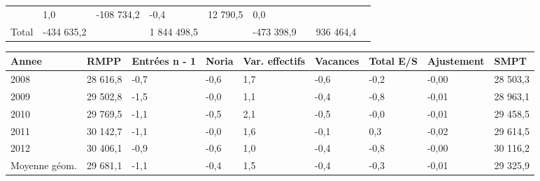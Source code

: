 \begin{longtable}[]{@{}lllllllll@{}}
\begin{minipage}[t]{0.17\columnwidth}
\end{minipage} & \begin{minipage}[t]{0.06\columnwidth}\raggedright
1,0\strut
\end{minipage} & \begin{minipage}[t]{0.12\columnwidth}\raggedright
-108 734,2\strut
\end{minipage} & \begin{minipage}[t]{0.06\columnwidth}\raggedright
-0,4\strut
\end{minipage} & \begin{minipage}[t]{0.08\columnwidth}\raggedright
12 790,5\strut
\end{minipage} & \begin{minipage}[t]{0.06\columnwidth}\raggedright
0,0\strut
\end{minipage}\tabularnewline
\begin{minipage}[t]{0.05\columnwidth}\raggedright
Total\strut
\end{minipage} & \begin{minipage}[t]{0.10\columnwidth}\raggedright
-434 635,2\strut
\end{minipage} & \begin{minipage}[t]{0.06\columnwidth}\raggedright
\strut
\end{minipage} & \begin{minipage}[t]{0.17\columnwidth}\raggedright
1 844 498,5\strut
\end{minipage} & \begin{minipage}[t]{0.06\columnwidth}\raggedright
\strut
\end{minipage} & \begin{minipage}[t]{0.12\columnwidth}\raggedright
-473 398,9\strut
\end{minipage} & \begin{minipage}[t]{0.06\columnwidth}\raggedright
\strut
\end{minipage} & \begin{minipage}[t]{0.08\columnwidth}\raggedright
936 464,4\strut
\end{minipage} & \begin{minipage}[t]{0.06\columnwidth}\raggedright
\strut
\end{minipage}\tabularnewline
\bottomrule
\end{longtable}

\begin{longtable}[]{@{}lllllllll@{}}
\toprule
Annee & RMPP & Entrées n - 1 & Noria & Var. effectifs & Vacances & Total
E/S & Ajustement & SMPT\tabularnewline
\midrule
\endhead
2008 & 28 616,8 & -0,7 & -0,6 & 1,7 & -0,6 & -0,2 & -0,00 & 28
503,3\tabularnewline
2009 & 29 502,8 & -1,5 & -0,0 & 1,1 & -0,4 & -0,8 & -0,01 & 28
963,1\tabularnewline
2010 & 29 769,5 & -1,1 & -0,5 & 2,1 & -0,5 & -0,0 & -0,01 & 29
458,5\tabularnewline
2011 & 30 142,7 & -1,1 & -0,0 & 1,6 & -0,1 & 0,3 & -0,02 & 29
614,5\tabularnewline
2012 & 30 406,1 & -0,9 & -0,6 & 1,0 & -0,4 & -0,8 & -0,00 & 30
116,2\tabularnewline
Moyenne géom. & 29 681,1 & -1,1 & -0,4 & 1,5 & -0,4 & -0,3 & -0,01 & 29
325,9\tabularnewline
\bottomrule
\end{longtable}

